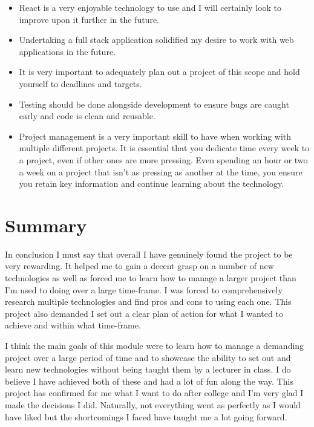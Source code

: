 \begin{itemize}
    \item React is a very enjoyable technology to use and I will certainly look to improve upon it further in the future.
    \item Undertaking a full stack application solidified my desire to work with web applications in the future.
    \item It is very important to adequately plan out a project of this scope and hold yourself to deadlines and targets.
    \item Testing should be done alongside development to ensure bugs are caught early and code is clean and reusable.
    \item Project management is a very important skill to have when working with multiple different projects. It is essential that you dedicate time every week to a project, even if other ones are more pressing. Even spending an hour or two a week on a project that isn't as pressing as another at the time, you ensure you retain key information and continue learning about the technology.
\end{itemize}
\section{Summary}
In conclusion I must say that overall I have genuinely found the project to be very rewarding. It helped me to gain a decent grasp on a number of new technologies as well as forced me to learn how to manage a larger project than I'm used to doing over a large time-frame. I was forced to comprehensively research multiple technologies and find pros and cons to using each one. This project also demanded I set out a clear plan of action for what I wanted to achieve and within what time-frame.

I think the main goals of this module were to learn how to manage a demanding project over a large period of time and to showcase the ability to set out and learn new technologies without being taught them by a lecturer in class. I do believe I have achieved both of these and had a lot of fun along the way. This project has confirmed for me what I want to do after college and I'm very glad I made the decisions I did. Naturally, not everything went as perfectly as I would have liked but the shortcomings I faced have taught me a lot going forward.